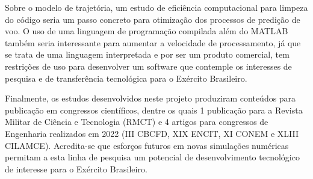 Sobre o modelo de trajetória, um estudo de eficiência computacional para limpeza do código seria um passo concreto para otimização dos processos de predição de voo. O uso de uma linguagem de programação compilada além do MATLAB\textregistered{} também seria interessante para aumentar a velocidade de processamento, já que se trata de uma linguagem interpretada e por ser um produto comercial, tem restrições de uso para desenvolver um software que contemple os interesses de pesquisa e de transferência tecnológica para o Exército Brasileiro.

Finalmente, os estudos desenvolvidos neste projeto produziram conteúdos para publicação em congressos científicos, dentre os quais 1 publicação para a Revista Militar de Ciência e Tecnologia (RMCT) e 4 artigos para congressos de Engenharia realizados em 2022 (III CBCFD, XIX ENCIT, XI CONEM e XLIII CILAMCE). Acredita-se que esforços futuros em novas simulações numéricas permitam a esta linha de pesquisa um potencial de desenvolvimento tecnológico de interesse para o Exército Brasileiro. 